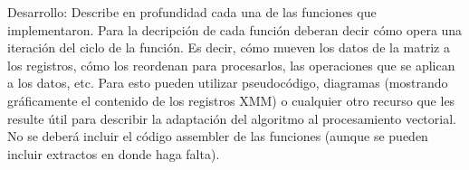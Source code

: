 Desarrollo: Describe en profundidad cada una de las funciones que implementaron.
Para la decripción de cada función deberan decir cómo opera una iteración del ciclo de la función. Es decir, cómo mueven los datos de la matriz a los registros, cómo los reordenan para procesarlos, las operaciones que se aplican a los datos, etc. Para esto pueden utilizar
pseudocódigo, diagramas (mostrando gráficamente el contenido de los registros XMM) o cualquier otro recurso que les resulte útil para describir la adaptación del algoritmo al procesamiento vectorial. No se deberá incluir el código assembler de las funciones (aunque se pueden incluir extractos en donde haga falta).
